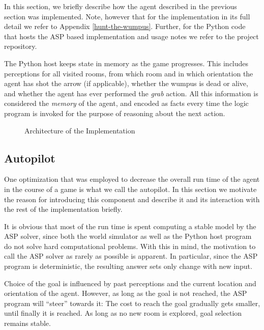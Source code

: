 \documentclass{llncs}
\begin{document}
In this section, we briefly describe how the agent described in the previous section was implemented. Note, however that for the implementation in its full detail we refer to Appendix \ref{hunt-the-wumpus}. Further, for the Python code that hosts the ASP based implementation and usage notes we refer to the project repository.

The Python host keeps state in memory as the game progresses. This includes perceptions for all visited rooms, from which room and in which orientation the agent has shot the arrow (if applicable), whether the wumpus is dead or alive, and whether the agent has ever performed the \emph{grab} action. All this information is considered the \emph{memory} of the agent, and encoded as facts every time the logic program is invoked for the purpose of reasoning about the next action.

\begin{figure}
\begin{center}

\end{center}
\caption{Architecture of the Implementation}
\label{fig:architecture}
\end{figure}

\subsection{Autopilot}

One optimization that was employed to decrease the overall run time of the agent in the course of a game is what we call the autopilot. In this section we motivate the reason for introducing this component and describe it and its interaction with the rest of the implementation briefly.

It is obvious that most of the run time is spent computing a stable model by the ASP solver, since both the world simulator as well as the Python host program do not solve hard computational problems. With this in mind, the motivation to call the ASP solver as rarely as possible is apparent. In particular, since the ASP program is deterministic, the resulting answer sets only change with new input.

Choice of the goal is influenced by past perceptions and the current location and orientation of the agent. However, as long as the goal is not reached, the ASP program will \enquote{steer} towards it: The cost to reach the goal gradually gets smaller, until finally it is reached. As long as no new room is explored, goal selection remains stable.
\end{document}
